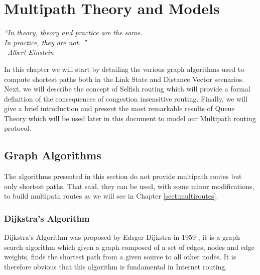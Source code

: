 \chapter{Multipath Theory and Models}
\label{chap:theory}

\begin{flushright}
 \textit{\textquotedblleft In theory, theory and practice are the same. \\ 
In practice, they are not. \textquotedblright}\\
\textit{--Albert Einstein}
\end{flushright}

\ifpdf
    \graphicspath{{4-Theory/Chapter3Figs/PNG/}{4-Theory/Chapter3Figs/PDF/}{4-Theory/Chapter3Figs/}}
\else
    \graphicspath{{4-Theory/Chapter3Figs/EPS/}{4-Theory/Chapter3Figs/}}
\fi

In this chapter we will start by detailing the various graph algorithms used to compute shortest paths both in the Link State and Distance Vector scenarios. Next, we will describe the concept of Selfish routing which will provide a formal definition of the consequences of congestion insensitive routing. Finally, we will give a brief introduction and present the most remarkable results of Queue Theory which will be used later in this document to model our Multipath routing protocol.


\section{Graph Algorithms}
\label{sect:GraphAlgo}

The algorithms presented in this section do not provide multipath routes but only shortest paths. That said, they can be used, with some minor modifications, to build multipath routes as we will see in Chapter \ref{sect:multiroutes}.

\subsection{Dijkstra's Algorithm}

Dijkstra's Algorithm was proposed by Edsger Dijkstra in 1959 \cite{DIJK}, it is a graph search algorithm which given a graph composed of a set of edges, nodes and edge weights, finds the shortest path from a given source to all other nodes. It is therefore obvious that this algorithm is fundamental in Internet routing.

